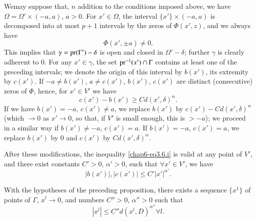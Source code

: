 We\pageoriginale may suppose that, $n$ addition to the conditions imposed above, we have $\Omega=\Omega'\times (-a,a)$, $a>0$. For $x'\in\Omega$, the interval $\{x'\}\times (-a,a)$ is decomposed into at most $p+1$ intervals by the zeros of $\Phi(x',z)$, and we always have
$$
\Phi (x',\pm a)\neq 0.
$$
This implies that $\gamma=\operatorname{pr}(\Gamma')-\delta$ is open and closed in $\Omega'-\delta$; further $\gamma$ is clearly adherent to $0$. For any $x'\in\gamma$, the set $\operatorname{pr}^{-1}(x')\cap \Gamma$ contains at least one of the preceding intervals; we denote the origin of this interval by $b(x')$, its extremity by $c(x')$. If $-a\neq b(x')$, $a\neq c(x')$, $b(x')$, $c(x')$ are distinct (consecutive) zeros of $\Phi$, hence, for $x'\in V'$ we have
\begin{equation*}
c(x')-b(x')\geq C d(x',\delta)^{\alpha}.\tag{3.6.i}\label{chap6-eq3.6.i}
\end{equation*}
If we have $b(x')=-a$, $c(x')\neq a$, we replace $b(x')$ by $c(x')-Cd(x',\delta)^{\alpha}$ (which $\to 0$ as $x'\to 0$, so that, if $V'$ is small enough, this is $>-a$); we proceed in a similar way if $b(x')\neq -a$, $c(x')=a$. If $b(x')=-a$, $c(x')=a$, we replace $b(x')$ by $0$ and $c(x')$ by $Cd(x',\delta)^{\alpha}$.

After these modifications, the inequality \eqref{chap6-eq3.6.i} is valid at any point of $V'$, and there exist constants $C'>0$, $\alpha'>0$, such that $\forall x'\in V'$, we have
\begin{equation*}
|b(x')|, |c(x')|\leq C'|x'|^{\alpha'}.\tag{3.6.ii}\label{chap6-eq3.6.ii}
\end{equation*}

\begin{lemma}\label{chap6-lem3.7}
With the hypotheses of the preceding proposition, there exists a sequence $\{x^{1}\}$ of points of $\Gamma$, $x^{l}\to 0$, and numbers $C''>0$, $\alpha''>0$ such that
$$
|x^{l}|\leq C'' d (x^{l},D)^{\alpha''}\forall l.
$$
\end{lemma}

